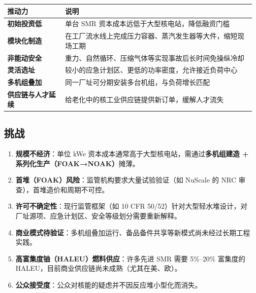 \documentclass[
  UTF8,
  scheme=plain,
  fontsize=10pt,
  openany
]{ctexbook}
\begin{document}
{\def\LTcaptype{none} %
\begin{longtable}[]{@{}
  >{\raggedright\arraybackslash}p{}
  >{\raggedright\arraybackslash}p{}@{}}
\toprule\noalign{}
\begin{minipage}[b]{\linewidth}\raggedright
推动力
\end{minipage} & \begin{minipage}[b]{\linewidth}\raggedright
说明
\end{minipage} \\
\midrule\noalign{}
\endhead
\bottomrule\noalign{}
\endlastfoot
\textbf{初始投资低} & 单台 SMR 资本成本远低于大型核电站，降低融资门槛 \\
\textbf{模块化制造} &
在工厂流水线上完成压力容器、蒸汽发生器等大件，缩短现场工期 \\
\textbf{非能动安全} &
重力、自然循环、压缩气体等实现事故后长时间免操纵冷却 \\
\textbf{灵活选址} &
较小的应急计划区、更低的功率密度，允许接近负荷中心 \\
\textbf{多机组叠加} & 同一厂址可分期安装多台机组，与负荷增长匹配 \\
\textbf{供应链与人才延续} &
给老化中的核工业供应链提供新订单，缓解人才流失 \\
\end{longtable}
}

\subsection{挑战}\label{ux6311ux6218}

\begin{enumerate}
\def\labelenumi{\arabic{enumi}.}
\tightlist
\item
  \textbf{规模不经济}：单位 kWe
  资本成本通常高于大型核电站，需通过\textbf{多机组建造 +
  系列化生产（FOAK→NOAK）}摊薄。
\item
  \textbf{首堆（FOAK）风险}：监管机构要求大量试验验证（如 NuScale 的 NRC
  审查），首堆造价和周期不可控。
\item
  \textbf{许可不确定性}：现行监管框架（如 10 CFR
  50/52）针对大型轻水堆设计，对厂址源项、应急计划区、安全等级划分需要重新解释。
\item
  \textbf{商业模式待验证}：多机组叠加运行、备品备件共享等新模式尚未经过长期工程实践。
\item
  \textbf{高富集度铀（HALEU）燃料供应}：许多先进 SMR 需要 5\%--20\%
  富集度的 HALEU，目前商业供应链尚未成熟（尤其在美、欧）。
\item
  \textbf{公众接受度}：公众对核能的疑虑并不因反应堆小型化而消失。
\end{enumerate}
\end{document}
